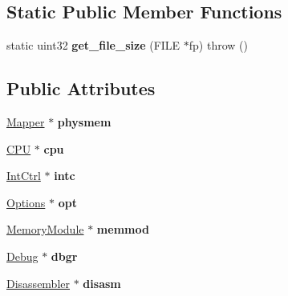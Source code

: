 \subsection*{Static Public Member Functions}
\begin{DoxyCompactItemize}
\item 
\hypertarget{classvmips_a4354f7aef601f61d923f8794e73d17aa}{
static uint32 {\bfseries get\_\-file\_\-size} (FILE $\ast$fp)  throw ()}
\label{classvmips_a4354f7aef601f61d923f8794e73d17aa}

\end{DoxyCompactItemize}
\subsection*{Public Attributes}
\begin{DoxyCompactItemize}
\item 
\hypertarget{classvmips_a205bf9dd1afc05f8472862411c5662bc}{
\hyperlink{classMapper}{Mapper} $\ast$ {\bfseries physmem}}
\label{classvmips_a205bf9dd1afc05f8472862411c5662bc}

\item 
\hypertarget{classvmips_a894fc31ccd3e941302d94bfa1ed4ccf2}{
\hyperlink{classCPU}{CPU} $\ast$ {\bfseries cpu}}
\label{classvmips_a894fc31ccd3e941302d94bfa1ed4ccf2}

\item 
\hypertarget{classvmips_a8181ed4a2475f6f46c100e864b43223c}{
\hyperlink{classIntCtrl}{IntCtrl} $\ast$ {\bfseries intc}}
\label{classvmips_a8181ed4a2475f6f46c100e864b43223c}

\item 
\hypertarget{classvmips_a553a8e8bf5c557ab9bf66bd643e7e8b5}{
\hyperlink{classOptions}{Options} $\ast$ {\bfseries opt}}
\label{classvmips_a553a8e8bf5c557ab9bf66bd643e7e8b5}

\item 
\hypertarget{classvmips_ab9df9188bbd2505338201a19552c0cb7}{
\hyperlink{classMemoryModule}{MemoryModule} $\ast$ {\bfseries memmod}}
\label{classvmips_ab9df9188bbd2505338201a19552c0cb7}

\item 
\hypertarget{classvmips_af4540ce57a78b02824f91ab26033e388}{
\hyperlink{classDebug}{Debug} $\ast$ {\bfseries dbgr}}
\label{classvmips_af4540ce57a78b02824f91ab26033e388}

\item 
\hypertarget{classvmips_a6882445296ef06c42b790ca04b9174ab}{
\hyperlink{classDisassembler}{Disassembler} $\ast$ {\bfseries disasm}}
\label{classvmips_a6882445296ef06c42b790ca04b9174ab}


\end{DoxyCompactItemize}
